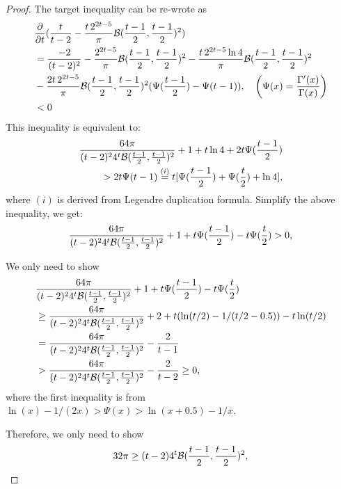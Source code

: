 \begin{proof}
The target inequality can be re-wrote as 
\begin{align*}
    &  \frac{\partial }{\partial t} (\frac{t}{t-2} - \frac{t \,2^{2t - 5}}{\pi}{\mathcal{B}}(\frac{t-1}{2}, \frac{t-1}{2})^2) \\
    &= \frac{-2}{(t-2)^2} 
    - \frac{2^{2t - 5}}{\pi}{\mathcal{B}}(\frac{t-1}{2},
    \frac{t-1}{2})^2
    - \frac{t \,2^{2t - 5} \ln 4}{\pi}{\mathcal{B}}(\frac{t-1}{2}, \frac{t-1}{2})^2
    \\
    & - \frac{2t \,2^{2t - 5}}{\pi}{\mathcal{B}}(\frac{t-1}{2}, \frac{t-1}{2})^2 (\Psi(\frac{t-1}{2})-\Psi(t-1)), \quad \left( \Psi(x) = \frac{\Gamma'(x)}{\Gamma(x)} \right)
    \\ & < 0
    \\
\end{align*}
This inequality is equivalent to:
\begin{align*}
    \frac{64 \pi }{(t-2)^2 4^t \mathcal{B}(\frac{t-1}{2},\frac{t-1}{2})^2} + 1 + t \ln 4+2t\Psi(\frac{t-1}{2}) \\
    > 2t\Psi(t-1) \stackrel{(i)}{=} t[\Psi(\frac{t-1}{2}) + \Psi(\frac{t}{2})+ \ln 4],
\end{align*}
where $(i)$ is derived from Legendre duplication formula.
Simplify the above inequality, we get:
\begin{align*}
    \frac{64 \pi }{(t-2)^2 4^t \mathcal{B}(\frac{t-1}{2},\frac{t-1}{2})^2} + 1 + t \Psi(\frac{t-1}{2}) - t\Psi(\frac{t}{2}) > 0,
\end{align*}

We only need to show 
\begin{align*}
    &\frac{64 \pi }{(t-2)^2 4^t \mathcal{B}(\frac{t-1}{2},\frac{t-1}{2})^2} + 1 + t \Psi(\frac{t-1}{2}) - t\Psi(\frac{t}{2})
    \\
    &\geq \frac{64 \pi }{(t-2)^2 4^t \mathcal{B}(\frac{t-1}{2},\frac{t-1}{2})^2} + 2 + t ( \ln(t/2)-1/(t/2-0.5) ) - t\ln (t/2)
    \\
    &= \frac{64 \pi }{(t-2)^2 4^t \mathcal{B}(\frac{t-1}{2},\frac{t-1}{2})^2} - \frac{2}{t-1}
    \\
    &> \frac{64 \pi }{(t-2)^2 4^t \mathcal{B}(\frac{t-1}{2},\frac{t-1}{2})^2} - \frac{2}{t-2} \geq 0 ,
\end{align*}
where the first inequality is from $\ln(x)-1/(2x)>\Psi(x) > \ln(x+0.5)-1/x$.

Therefore, we only need to show 
\begin{align*}
32 \pi \geq (t-2) 4^t \mathcal{B}(\frac{t-1}{2},\frac{t-1}{2})^2,
\end{align*}


\end{proof}
